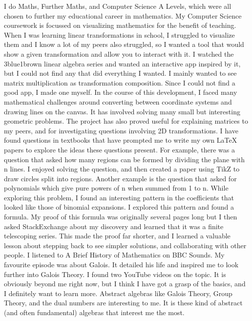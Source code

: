 \documentclass[a4paper, 12pt]{article}
\newenvironment{personalstatement}{\directlua{startPersonalStatement()}}{\directlua{stopPersonalStatement()}}
\begin{document}
\begin{personalstatement}
I do Maths, Further Maths, and Computer Science A Levels, which were all chosen to further my educational career in mathematics.
My Computer Science coursework is focussed on visualizing mathematics for the benefit of teaching. When I was learning linear transformations in school, I struggled to visualize them and I know a lot of my peers also struggled, so I wanted a tool that would show a given transformation and allow you to interact with it. I watched the 3blue1brown linear algebra series and wanted an interactive app inspired by it, but I could not find any that did everything I wanted. I mainly wanted to see matrix multiplication as transformation composition. Since I could not find a good app, I made one myself. In the course of this development, I faced many mathematical challenges around converting between coordinate systems and drawing lines on the canvas. It has involved solving many small but interesting geometric problems. The project has also proved useful for explaining matrices to my peers, and for investigating questions involving 2D transformations.
I have found questions in textbooks that have prompted me to write my own LaTeX papers to explore the ideas these questions present. For example, there was a question that asked how many regions can be formed by dividing the plane with n lines. I enjoyed solving the question, and then created a paper using TikZ to draw circles split into regions. Another example is the question that asked for polynomials which give pure powers of n when summed from 1 to n. While exploring this problem, I found an interesting pattern in the coefficients that looked like those of binomial expansions. I explored this pattern and found a formula. My proof of this formula was originally several pages long but I then asked StackExchange about my discovery and learned that it was a finite telescoping series. This made the proof far shorter, and I learned a valuable lesson about stepping back to see simpler solutions, and collaborating with other people.
I listened to A Brief History of Mathematics on BBC Sounds. My favourite episode was about Galois. It detailed his life and inspired me to look further into Galois Theory. I found two YouTube videos on the topic. It is obviously beyond me right now, but I think I have got a grasp of the basics, and I definitely want to learn more. Abstract algebras like Galois Theory, Group Theory, and the dual numbers are interesting to me. It is these kind of abstract (and often fundamental) algebras that interest me the most.

\end{personalstatement}
\end{document}
